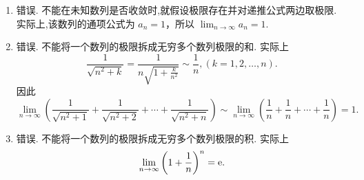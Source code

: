 \begin{solution}
    \begin{enumerate}
        \item 错误. 不能在未知数列是否收敛时,就假设极限存在并对递推公式两边取极限. 实际上,该数列的通项公式为 $a_n = 1$，所以 $\lim_{n\to\infty} a_n = 1$.
        \item 错误. 不能将一个数列的极限拆成无穷多个数列极限的和. 实际上
              $$
                  \frac{1}{\sqrt{n^2+k}} = \frac{1}{n\sqrt{1+\frac{k}{n^2}}} \sim \frac{1}{n}, (k=1,2,\ldots,n).
              $$
              因此
              $$
                  \lim_{n\to\infty} \left( \frac{1}{\sqrt{n^2+1}} + \frac{1}{\sqrt{n^2+2}} + \cdots + \frac{1}{\sqrt{n^2+n}} \right) \sim \lim_{n\to\infty} \left( \frac{1}{n} + \frac{1}{n} + \cdots + \frac{1}{n} \right) = 1.
              $$
        \item 错误. 不能将一个数列的极限拆成无穷多个数列极限的积. 实际上
              $$
                  \lim_{n\to\infty} \left(1 + \frac{1}{n}\right)^n = \mathrm{e}.
              $$
    \end{enumerate}
\end{solution}

